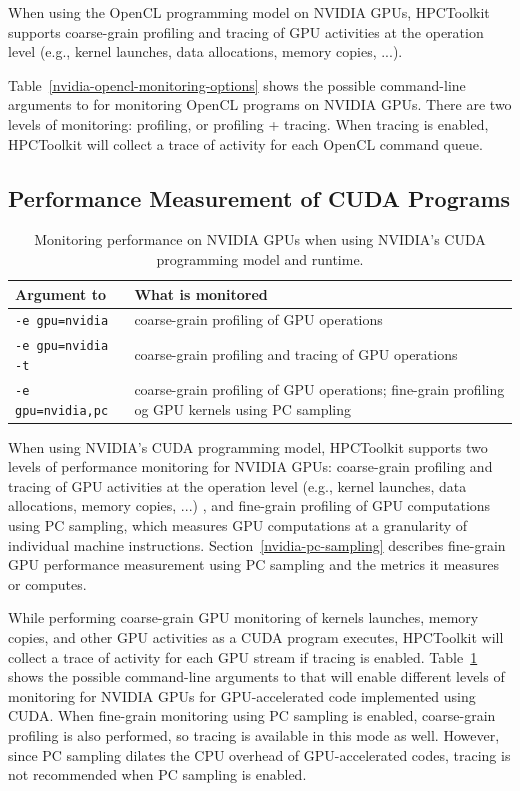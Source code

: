 When using the OpenCL programming model on NVIDIA GPUs, HPCToolkit supports coarse-grain profiling and tracing of GPU activities at the operation level (e.g., kernel launches, data allocations, memory copies, ...).

Table~\ref{nvidia-opencl-monitoring-options} shows the possible command-line arguments to \hpcrun{} for monitoring  OpenCL programs on NVIDIA GPUs. There are two levels of monitoring: profiling, or profiling + tracing. When tracing is enabled,  HPCToolkit will collect a trace of activity for each OpenCL command queue. 

\subsection{Performance Measurement of CUDA Programs}

\begin{table}[t]
\centering
\begin{tabular}{|l|p{3.5in}|}\hline
Argument to \hpcrun{} & What is monitored\\\hline\hline
{\tt -e gpu=nvidia} & coarse-grain profiling of GPU operations\\\hline
{\tt -e gpu=nvidia -t} & coarse-grain profiling and tracing of GPU operations\\\hline
{\tt -e gpu=nvidia,pc} &  coarse-grain profiling of GPU operations; fine-grain profiling og GPU kernels using PC sampling\\\hline
\end{tabular}
\caption{Monitoring performance on NVIDIA GPUs when using NVIDIA's CUDA programming model and runtime.}
\label{nvidia-cuda-monitoring-options} 
\end{table}

When using NVIDIA's CUDA programming model, HPCToolkit supports two levels of performance monitoring for NVIDIA GPUs: coarse-grain profiling and tracing of GPU activities at the operation level (e.g., kernel launches, data allocations, memory copies, ...) , and fine-grain profiling of GPU computations using PC sampling, which measures GPU computations at a granularity of individual machine instructions. Section~\ref{nvidia-pc-sampling} describes fine-grain GPU performance measurement using PC sampling and the metrics it measures or computes. 

While performing coarse-grain GPU monitoring of kernels launches, memory copies, and other GPU activities as a CUDA program executes, HPCToolkit will collect a trace of activity for each GPU stream if tracing is enabled. Table~\ref{nvidia-cuda-monitoring-options} shows the possible command-line arguments to \hpcrun{} that will enable different levels of monitoring  for NVIDIA GPUs for GPU-accelerated code implemented using CUDA. When fine-grain monitoring using PC sampling is enabled, coarse-grain profiling is also performed, so tracing is available in this mode as well. However, since PC sampling dilates the CPU overhead of GPU-accelerated codes, tracing is not recommended when PC sampling is enabled.

